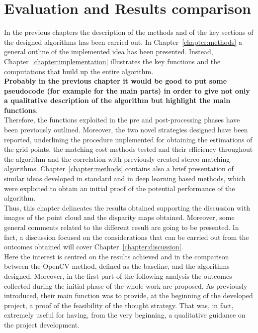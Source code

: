\chapter{Evaluation and Results comparison}
\label{chapter:evaluation}

In the previous chapters the description of the methods and of the key sections of the designed algorithms has been carried out.
In Chapter~\ref{chapter:methods} a general outline of the implemented idea has been presented.
Instead, Chapter~\ref{chapter:implementation} illustrates the key functions and the computations that build up the entire algorithm.\\
\textbf{Probably in the previous chapter it would be good to put some pseudocode (for example for the main parts) in order to give not only a qualitative description of the algorithm but highlight the main functions}.\\
Therefore, the functions exploited in the pre and post-processing phases have been previously outlined. 
Moreover, the two novel strategies designed have been reported, underlining the procedure implemented for obtaining the estimations of the grid points, the matching cost methods tested and their efficiency throughout the algorithm and the correlation with previously created stereo matching algorithms. 
Chapter~\ref{chapter:methods} contains also a brief presentation of similar ideas developed in standard and in deep learning based methods, which were exploited to obtain an initial proof of the potential performance of the algorithm.\\
Thus, this chapter delineates the results obtained supporting the discussion with images of the point cloud and the disparity maps obtained.
Moreover, some general comments related to the different result are going to be presented.
In fact, a discussion focused on the considerations that can be carried out from the outcomes obtained will cover Chapter~\ref{chapter:discussion}.\\
Here the interest is centred on the results achieved and in the comparison between the OpenCV method, defined as the baseline, and the algorithms designed.
Moreover, in the first part of the following analysis the outcomes collected during the initial phase of the whole work are proposed.
As previously introduced, their main function was to provide, at the beginning of the developed project, a proof of the feasibility of the thought strategy. 
That was, in fact, extremely useful for having, from the very beginning, a qualitative guidance on the project development. 

